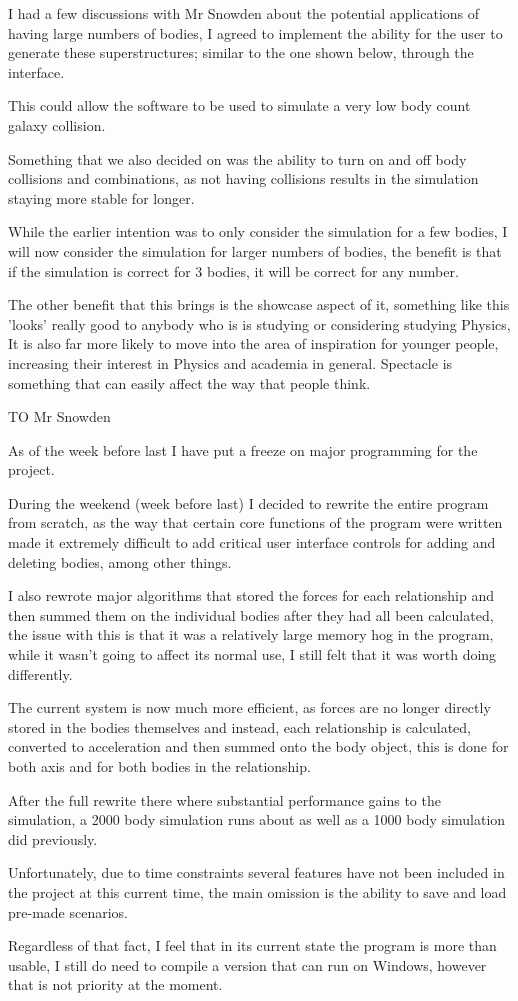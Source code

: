 {I had a few discussions with Mr Snowden about the potential applications of having large numbers of bodies, I agreed to implement the ability for the user to generate these superstructures; similar to the one shown below, through the interface. 

This could allow the software to be used to simulate a very low body count galaxy collision.

Something that we also decided on was the ability to turn on and off body collisions and combinations, as not having collisions results in the simulation staying more stable for longer.

While the earlier intention was to only consider the simulation for a few bodies, I will now consider the simulation for larger numbers of bodies, the benefit is that if the simulation is correct for 3 bodies, it will be correct for any number.

The other benefit that this brings is the showcase aspect of it, something like this 'looks' really good to anybody who is is studying or considering studying Physics, It is also far more likely to move into the area of inspiration for younger people, increasing their interest in Physics and academia in general. Spectacle is something that can easily affect the way that people think.

\vspace{8pt}
\pagebreak

TO Mr Snowden

As of the week before last I have put a freeze on major programming for the project.

During the weekend (week before last) I decided to rewrite the entire program from scratch, as the way that certain core functions of the program were written made it extremely difficult to add critical user interface controls for adding and deleting bodies, among other things.

I also rewrote major algorithms that stored the forces for each relationship and then summed them on the individual bodies after they had all been calculated, the issue with this is that it was a relatively large memory hog in the program, while it wasn't going to affect its normal use, I still felt that it was worth doing differently.

The current system is now much more efficient, as forces are no longer directly stored in the bodies themselves and instead, each relationship is calculated, converted to acceleration and then summed onto the body object, this is done for both axis and for both bodies in the relationship.

After the full rewrite there where substantial performance gains to the simulation, a 2000 body simulation runs about as well as a 1000 body simulation did previously.

Unfortunately, due to time constraints several features have not been included in the project at this current time, the main omission is the ability to save and load pre-made scenarios.

Regardless of that fact, I feel that in its current state the program is more than usable, I still do need to compile a version that can run on Windows, however that is not priority at the moment.
}
